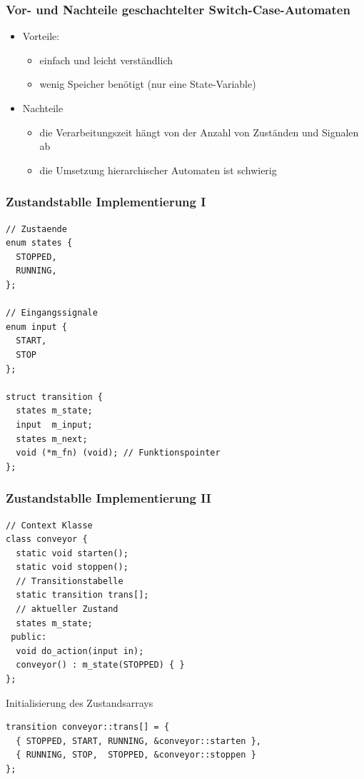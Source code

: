\documentclass{beamer}
\begin{document}
\begin{frame}
	\frametitle{Vor- und Nachteile geschachtelter Switch-Case-Automaten}
	\begin{itemize}
		\item Vorteile:
		\begin{itemize}
			\item einfach und leicht verst\"andlich
			\item wenig Speicher ben\"otigt (nur eine State-Variable)
		\end{itemize}
		\item Nachteile
		\begin{itemize}
			\item die Verarbeitungszeit h\"angt von der Anzahl von Zust\"anden und Signalen ab
			\item die Umsetzung hierarchischer Automaten ist schwierig 
		\end{itemize}
	\end{itemize}
\end{frame}

\begin{frame}[fragile]
 \frametitle{Zustandstablle Implementierung I}
 \begin{lstlisting}
// Zustaende
enum states {
  STOPPED,
  RUNNING,
};

// Eingangssignale
enum input {
  START,
  STOP
};

struct transition {
  states m_state;
  input  m_input;
  states m_next;
  void (*m_fn) (void); // Funktionspointer
};
 \end{lstlisting}
\end{frame}

\begin{frame}[fragile]
 \frametitle{Zustandstablle Implementierung II}
 \begin{lstlisting}
// Context Klasse
class conveyor {
  static void starten();
  static void stoppen();
  // Transitionstabelle
  static transition trans[];
  // aktueller Zustand
  states m_state;
 public:
  void do_action(input in);
  conveyor() : m_state(STOPPED) { }
};
 \end{lstlisting}
 Initialisierung des Zustandsarrays
 \begin{lstlisting}
transition conveyor::trans[] = {
  { STOPPED, START, RUNNING, &conveyor::starten },
  { RUNNING, STOP,  STOPPED, &conveyor::stoppen }
};
 \end{lstlisting}
\end{frame}
\end{document}
